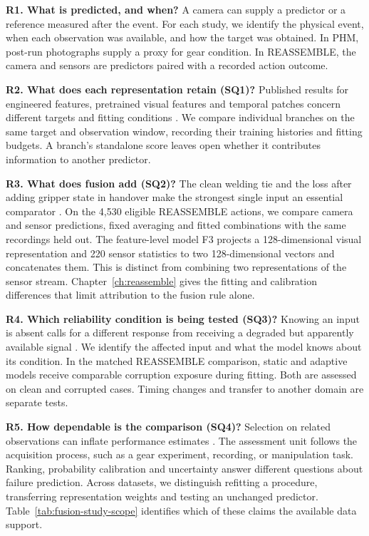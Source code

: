 \textbf{R1. What is predicted, and when?} A camera can supply a predictor or a reference measured after the event. For each study, we identify the physical event, when each observation was available, and how the target was obtained. In PHM, post-run photographs supply a proxy for gear condition. In REASSEMBLE, the camera and sensors are predictors paired with a recorded action outcome.

\textbf{R2. What does each representation retain (SQ1)?} Published results for engineered features, pretrained visual features and temporal patches concern different targets and fitting conditions \parencite{horwitz_back_2023,roth_towards_2022,nie_time_2023}. We compare individual branches on the same target and observation window, recording their training histories and fitting budgets. A branch's standalone score leaves open whether it contributes information to another predictor.

\textbf{R3. What does fusion add (SQ2)?} The clean welding tie and the loss after adding gripper state in handover make the strongest single input an essential comparator \parencite{hua_anti-interference_2026,thoduka_multimodal_2024}. On the 4,530 eligible REASSEMBLE actions, we compare camera and sensor predictions, fixed averaging and fitted combinations with the same recordings held out. The feature-level model F3 projects a 128-dimensional visual representation and 220 sensor statistics to two 128-dimensional vectors and concatenates them. This is distinct from combining two representations of the sensor stream. Chapter~\ref{ch:reassemble} gives the fitting and calibration differences that limit attribution to the fusion rule alone.

\textbf{R4. Which reliability condition is being tested (SQ3)?} Knowing an input is absent calls for a different response from receiving a degraded but apparently available signal \parencite{deng_tc-maf_2026,zhang_provable_2023}. We identify the affected input and what the model knows about its condition. In the matched REASSEMBLE comparison, static and adaptive models receive comparable corruption exposure during fitting. Both are assessed on clean and corrupted cases. Timing changes and transfer to another domain are separate tests.

\textbf{R5. How dependable is the comparison (SQ4)?} Selection on related observations can inflate performance estimates \parencite{varma_bias_2006,kapoor_leakage_2023}. The assessment unit follows the acquisition process, such as a gear experiment, recording, or manipulation task. Ranking, probability calibration and uncertainty answer different questions about failure prediction. Across datasets, we distinguish refitting a procedure, transferring representation weights and testing an unchanged predictor. Table~\ref{tab:fusion-study-scope} identifies which of these claims the available data support.

